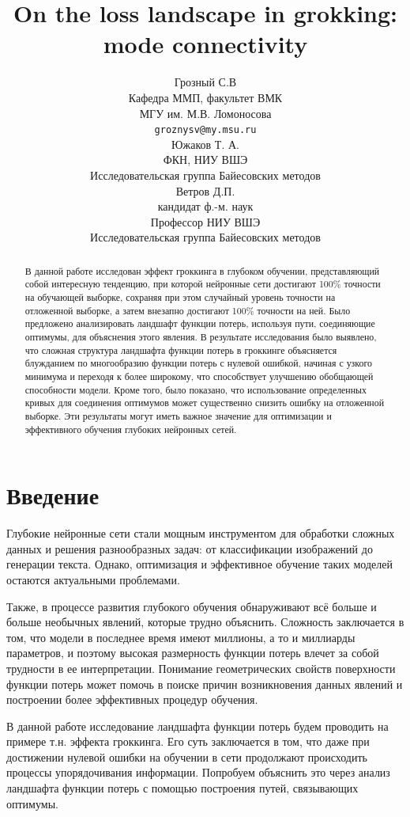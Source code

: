 \documentclass{article} %
\title{On the loss landscape in grokking: mode connectivity}
\author{ Грозный С.В \\
	Кафедра ММП, факультет ВМК \\
    МГУ им. М.В. Ломоносова\\
	\texttt{groznysv@my.msu.ru} \\
	\And
    Южаков Т. А.\\
	ФКН, НИУ ВШЭ\\
    Исследовательская группа Байесовских методов\\
    \And
    Ветров Д.П.\\
    кандидат ф.-м. наук\\
    Профессор НИУ ВШЭ\\
    Исследовательская группа Байесовских методов\\
}
\date{}
\begin{document}
\maketitle
\begin{abstract}
	В данной работе исследован эффект гроккинга в глубоком обучении, представляющий собой интересную тенденцию, при которой нейронные сети достигают 100\% точности на обучающей выборке, сохраняя при этом случайный уровень точности на отложенной выборке, а затем внезапно достигают 100\% точности на ней. Было предложено анализировать ландшафт функции потерь, используя пути, соединяющие оптимумы, для объяснения этого явления. В результате исследования было выявлено, что сложная структура ландшафта функции потерь в гроккинге объясняется блужданием по многообразию функции потерь с нулевой ошибкой, начиная с узкого минимума и переходя к более широкому, что способствует улучшению обобщающей способности модели. Кроме того, было показано, что использование определенных кривых для соединения оптимумов может существенно снизить ошибку на отложенной выборке. Эти результаты могут иметь важное значение для оптимизации и эффективного обучения глубоких нейронных сетей.
\end{abstract}
\section{Введение}
Глубокие нейронные сети стали мощным инструментом для обработки сложных данных и решения разнообразных задач: от классификации изображений до генерации текста. Однако, оптимизация и эффективное обучение таких моделей остаются актуальными проблемами.

Также, в процессе развития глубокого обучения обнаруживают всё больше и больше необычных явлений, которые трудно объяснить. Сложность заключается в том, что модели в последнее время имеют миллионы, а то и миллиарды параметров, и поэтому высокая размерность функции потерь влечет за собой трудности в ее интерпретации. Понимание геометрических свойств поверхности функции потерь может помочь в поиске причин возникновения данных явлений и построении более эффективных процедур обучения. 

В данной работе исследование ландшафта функции потерь будем проводить на примере т.н. эффекта гроккинга\cite{power2022grokking}. Его суть заключается в том, что даже при достижении нулевой ошибки на обучении в сети продолжают происходить процессы упорядочивания информации. Попробуем объяснить это через анализ ландшафта функции потерь с помощью построения путей, связывающих оптимумы. 
\end{document}
